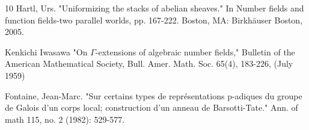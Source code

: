 \documentclass[12pt]{article}
\theoremstyle{definition}
\numberwithin{equation}{section}
\begin{document}
\begin{thebibliography}{10}
 Hartl, Urs. "Uniformizing the stacks of abelian sheaves." In Number fields and function fields-two parallel worlds, pp. 167-222. Boston, MA: Birkh\"auser Boston, 2005.


 Kenkichi Iwasawa "On  $\Gamma$-extensions of algebraic number fields," Bulletin of the American Mathematical Society, Bull. Amer. Math. Soc. 65(4), 183-226, (July 1959)



 Fontaine, Jean-Marc. "Sur certains types de repr\'esentations p-adiques du groupe de Galois d'un corps local; construction d'un anneau de Barsotti-Tate." Ann. of math 115, no. 2 (1982): 529-577.

\end{thebibliography}
\end{document}
